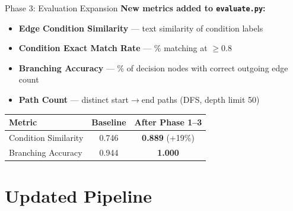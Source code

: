 \documentclass[aspectratio=169, 12pt]{beamer}
\begin{document}
\begin{frame}{Phase 3: Evaluation Expansion}
\textbf{New metrics added to \texttt{evaluate.py}:}
\vspace{0.3cm}
\begin{itemize}
    \item \textbf{Edge Condition Similarity} --- text similarity of condition labels
    \item \textbf{Condition Exact Match Rate} --- \% matching at $\geq$0.8
    \item \textbf{Branching Accuracy} --- \% of decision nodes with correct outgoing edge count
    \item \textbf{Path Count} --- distinct start$\rightarrow$end paths (DFS, depth limit 50)
\end{itemize}

\vspace{0.5cm}
\begin{center}
\begin{tabular}{lcc}
\toprule
\textbf{Metric} & \textbf{Baseline} & \textbf{After Phase 1--3} \\
\midrule
Condition Similarity & 0.746 & \textbf{0.889} (+19\%)\\
Branching Accuracy   & 0.944 & \textbf{1.000} \\
\bottomrule
\end{tabular}
\end{center}
\end{frame}

\section{Updated Pipeline}
\end{document}
